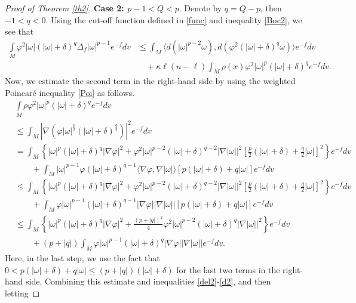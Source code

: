 \documentclass[10pt,a4paper]{amsart}
\numberwithin{equation}{section}
\begin{document}
\begin{proof}[Proof of Theorem \ref{th2}]
	\textbf{Case 2: $p-1<Q<p$}. Denote by $q=Q-p$, then $-1<q<0$. Using the cut-off function defined in \eqref{func} and inequality \eqref{Boc2}, we see that
	\begin{align}\label{c22}\nonumber
		\int\limits_M \varphi ^2|\omega |(|\omega|+\delta)^q \Delta_f |\omega |^{p-1} e^{-f} dv &\le 
		\int_M \langle d(|\omega|^{p-2}\omega),d(\varphi^2 (|\omega|+\delta)^q\omega) \rangle e^{-f}dv\\
		&\quad +\kappa\ell(n-\ell)\int_M \rho(x)\varphi^2 |\omega|^{p}(|\omega|+\delta)^{q}e^{-f}dv.
	\end{align}
	Now, we estimate the second term in the right-hand side by using the weighted Poincar\'e inequality \eqref{Poi} as follows.
	\begin{align}\label{rh} \nonumber
		&\int\limits_M \rho\varphi ^2|\omega |^{p}(|\omega|{+}\delta)^q e^{-f}dv\\\nonumber
		&\le \int_M \left|\nabla \left( \varphi |\omega|^{\frac{p}{2}}(|\omega|{+}\delta)^{\frac{q}{2}} \right)\right|^2 e^{-f}dv\\\nonumber
		&=\int_M \left\{ |\omega|^p (|\omega|{+}\delta)^q |\nabla \varphi|^2 +\varphi^2 |\omega|^{p-2}(|\omega|{+}\delta)^{q-2} |\nabla |\omega||^2 \left[ \frac{p}{2}(|\omega|{+}\delta)+\frac{q}{2}|\omega|  \right]^2 \right\}e^{-f}dv\\\nonumber
		&\qquad + \int_M |\omega|^{p-1}\varphi (|\omega|{+}\delta)^{q-1} \langle \nabla \varphi, \nabla |\omega| \rangle \left[p(|\omega|{+}\delta)+q|\omega|\right]e^{-f}dv\\\nonumber
		&\le \int_M \left\{ |\omega|^p (|\omega|{+}\delta)^q |\nabla \varphi|^2 +\varphi^2 |\omega|^{p-2}(|\omega|{+}\delta)^{q-2} |\nabla |\omega||^2 \left[ \frac{p}{2}(|\omega|{+}\delta)+\frac{q}{2}|\omega|  \right]^2 \right\}e^{-f}dv\\\nonumber
		&\qquad+ \int_M \varphi|\omega|^{p-1} (|\omega|{+}\delta)^{q-1} |\nabla \varphi| |\nabla |\omega||  \left[p(|\omega|{+}\delta)+q|\omega|\right]e^{-f}dv\\\nonumber
		&\le \int_M \left\{ |\omega|^p (|\omega|{+}\delta)^q |\nabla \varphi|^2 +\frac{(p+|q|)^2}{4}\varphi^2 |\omega|^{p-2}(|\omega|{+}\delta)^{q} |\nabla |\omega||^2  \right\}e^{-f}dv\\
		&\qquad + (p+|q|)\int_M \varphi |\omega|^{p-1} (|\omega|{+}\delta)^{q} |\nabla \varphi| |\nabla |\omega|| e^{-f}dv.			
	\end{align}
	Here, in the last step, we use the fact that  $0< p(|\omega|+\delta)+q|\omega|  \le (p+|q|)(|\omega|+\delta)$ for the last two terms in the right-hand side.	Combining this estimate and inequalities \eqref{del2}-\eqref{d2}, and then letting

\end{proof}
\end{document}
